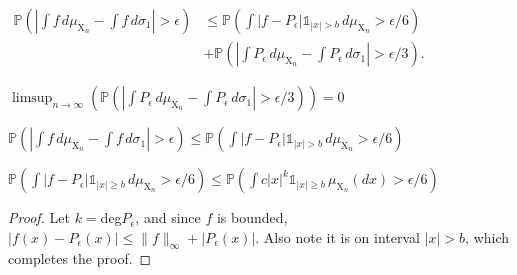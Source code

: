 

\begin{lemma}
    \label{lem:reestimate}
    \notready
     $\begin{align*} \mathbb{P}\left( \left|\int f\,d\mu_{\mathrm{X}_n} - \int f\,d\sigma_1\right|>\epsilon\right) &\le \mathbb{P}\left(\int |f-P_\epsilon|\mathbb{1}_{|x|> b}\,d\mu_{\mathrm{X}_n}>\epsilon/6\right) \\ 
     &+ \mathbb{P}\left(\left|\int P_\epsilon\,d\mu_{\mathrm{X}_n} - \int P_\epsilon\,d\sigma_1\right| >\epsilon/3\right).
     \end{align*}$
\end{lemma}


\begin{lemma}
    \label{lem:second_term_estimate}
    \uses{} %
    \notready
    $ \limsup_{n \to \infty} \left(\mathbb{P}\left(\left|\int P_\epsilon\,d\mu_{\mathrm{X}_n} - \int P_\epsilon\,d\sigma_1\right| >\epsilon/3\right) \right) = 0 $

\end{lemma}



\begin{lemma}
    \label{lem:final_estimate}
    \notready
    $\mathbb{P}\left( \left|\int f\,d\mu_{\mathrm{X}_n} - \int f\,d\sigma_1\right|>\epsilon\right) \leq \mathbb{P}\left(\int |f-P_\epsilon|\mathbb{1}_{|x|> b}\,d\mu_{\mathrm{X}_n}>\epsilon/6\right)$
\end{lemma}



\begin{lemma}  
    \label{lem:polynomial_ineq}
    \uses{}
    \notready
    $ \mathbb{P}\left(\int |f-P_\epsilon| \mathbb{1}_{|x|\ge b}\,d\mu_{\mathrm{X}_n} > \epsilon/6\right) \le \mathbb{P}\left(\int c|x|^k\mathbb{1}_{|x|\ge b}\,\mu_{\mathrm{X}_n}(dx) > \epsilon/6\right) $
    \begin{proof}
    Let $k =$deg$P_\epsilon$, and since $f$ is bounded, $|f(x) - P_{\epsilon}(x)| \leq \|f\|_{\infty} + |P_\epsilon(x)|$. Also note it is on interval $|x| > b$, which completes the proof.
    \end{proof}
\end{lemma}


